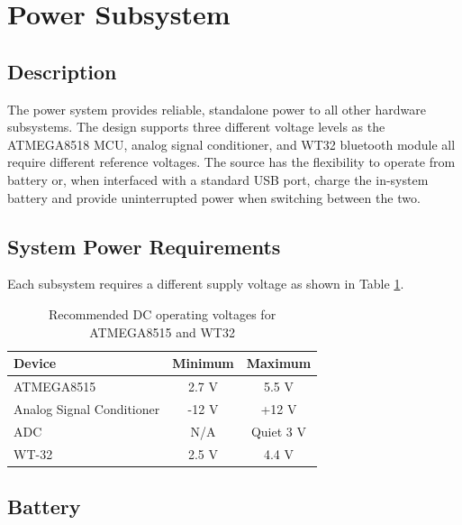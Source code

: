 \section [Power]{Power Subsystem}
\subsection{Description}

The power system  provides reliable, standalone power to all other hardware subsystems. The design supports three different voltage levels as the ATMEGA8518 MCU, analog signal conditioner, and WT32 bluetooth module all require different reference voltages. The source has the flexibility to operate from battery or, when interfaced with a standard USB port, charge the in-system battery and provide uninterrupted power when switching between the two.  

\subsection{System Power Requirements}

Each subsystem requires a different supply voltage as shown in Table \ref{tab:power requirements}. 
\begin{table}[bhp]
\caption[Power Requirements]{Recommended DC operating voltages for ATMEGA8515\cite{ds:ATMEGA8515} and WT32\cite{ds:WT32}}
\small
\begin{center}
\begin{tabular}{l| c c}
\setlength{\tabcolsep}{1pt}
	Device     & Minimum   & Maximum \\\hline
	ATMEGA8515 & 2.7 V     & 5.5 V   \\             
	Analog Signal 
	Conditioner& -12 V     & +12 V\\            
  \small{ADC}& N/A		   & Quiet 3 V\\
	WT-32      & 2.5 V     & 4.4 V            
\end{tabular}
\end{center}
\label{tab:power requirements}
\end{table}

\subsection{Battery}

